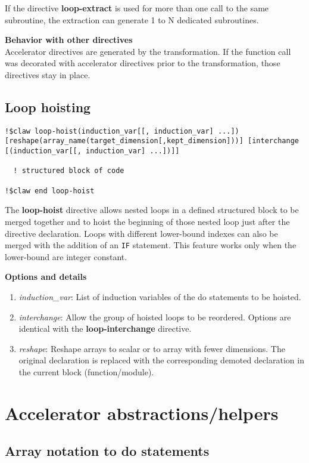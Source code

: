 \documentclass{article}
\begin{document}
If the directive \textbf{loop-extract} is used for more than one call to the same
subroutine, the extraction can generate 1 to N dedicated subroutines.

\textbf{Behavior with other directives}\\
Accelerator directives are generated by the transformation. If the function call was decorated 
with accelerator directives prior to the transformation, those directives stay in place. 

\subsection{Loop hoisting}
\begin{lstlisting}
!$claw loop-hoist(induction_var[[, induction_var] ...]) [reshape(array_name(target_dimension[,kept_dimension]))] [interchange [(induction_var[[, induction_var] ...])]]

  ! structured block of code
  
!$claw end loop-hoist
\end{lstlisting}

The \textbf{loop-hoist} directive allows nested loops in a defined structured block to
be merged together and to hoist the beginning of those nested loop just after
the directive declaration. Loops with different lower-bound indexes
can also be merged with the addition of an \lstinline!IF! statement. This feature works 
only when the lower-bound are integer constant. 


\textbf{Options and details}
\begin{enumerate}
\item \textit{induction\_var}: List of induction variables of the do statements to be hoisted. 
\item \textit{interchange}: Allow the group of hoisted loops to be reordered.
Options are identical with the \textbf{loop-interchange} directive.
\item \textit{reshape}: Reshape arrays to scalar or to array with fewer dimensions. The original declaration is replaced with the corresponding demoted declaration in the current block (function/module). 
\end{enumerate}


\section{Accelerator abstractions/helpers}

\subsection{Array notation to do statements}
\end{document}
